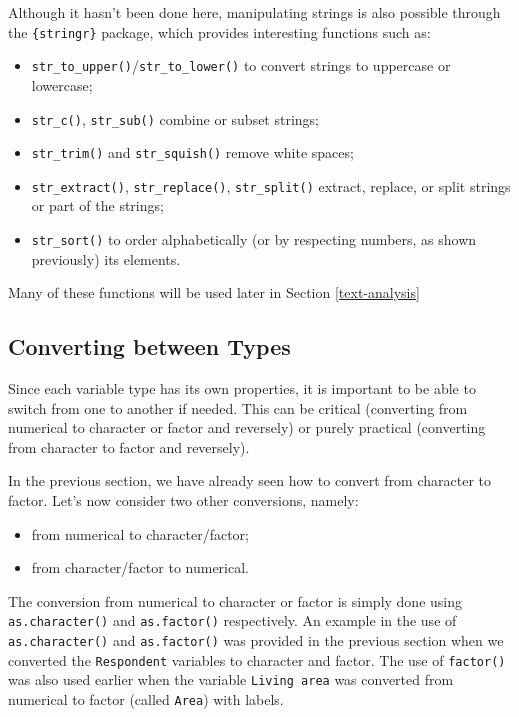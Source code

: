 \documentclass[
]{krantz}
\providecommand{\tightlist}{%
  \setlength{\itemsep}{0pt}\setlength{\parskip}{0pt}}
\begin{document}
Although it hasn't been done here, manipulating strings is also possible through the \texttt{\{stringr\}} package, which provides interesting functions such as:

\begin{itemize}
\tightlist
\item
  \texttt{str\_to\_upper()}/\texttt{str\_to\_lower()} to convert strings to uppercase or lowercase;
\item
  \texttt{str\_c()}, \texttt{str\_sub()} combine or subset strings;
\item
  \texttt{str\_trim()} and \texttt{str\_squish()} remove white spaces;
\item
  \texttt{str\_extract()}, \texttt{str\_replace()}, \texttt{str\_split()} extract, replace, or split strings or part of the strings;
\item
  \texttt{str\_sort()} to order alphabetically (or by respecting numbers, as shown previously) its elements.
\end{itemize}

Many of these functions will be used later in Section \ref{text-analysis}

\hypertarget{converting-between-types}{%
\subsection{Converting between Types}\label{converting-between-types}}

Since each variable type has its own properties, it is important to be able to switch from one to another if needed. This can be critical (converting from numerical to character or factor and reversely) or purely practical (converting from character to factor and reversely).

In the previous section, we have already seen how to convert from character to factor. Let's now consider two other conversions, namely:

\begin{itemize}
\tightlist
\item
  from numerical to character/factor;
\item
  from character/factor to numerical.
\end{itemize}

The conversion from numerical to character or factor is simply done using \texttt{as.character()} and \texttt{as.factor()} respectively. An example in the use of \texttt{as.character()} and \texttt{as.factor()} was provided in the previous section when we converted the \texttt{Respondent} variables to character and factor. The use of \texttt{factor()} was also used earlier when the variable \texttt{Living\ area} was converted from numerical to factor (called \texttt{Area}) with labels.
\end{document}
